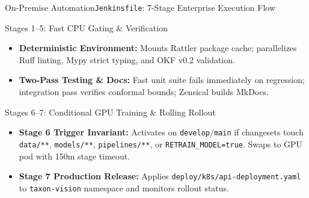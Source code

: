 \begin{frame}[fragile]{On-Premise Automation}{\texttt{Jenkinsfile}: 7-Stage Enterprise Execution Flow}
    \begin{block}{Stages 1--5: Fast CPU Gating \& Verification}
        \begin{itemize}\tiny
            \item \textbf{Deterministic Environment:} Mounts Rattler package cache; parallelizes Ruff linting, Mypy strict typing, and OKF v0.2 validation.
            \item \textbf{Two-Pass Testing \& Docs:} Fast unit suite fails immediately on regression; integration pass verifies conformal bounds; Zensical builds MkDocs.
        \end{itemize}
    \end{block}
    \begin{block}{Stages 6--7: Conditional GPU Training \& Rolling Rollout}
        \begin{itemize}\tiny
            \item \textbf{Stage 6 Trigger Invariant:} Activates on \texttt{develop}/\texttt{main} if changesets touch \texttt{data/**}, \texttt{models/**}, \texttt{pipelines/**}, or \texttt{RETRAIN\_MODEL=true}. Swaps to GPU pod with 150m stage timeout.
            \item \textbf{Stage 7 Production Release:} Applies \texttt{deploy/k8s/api-deployment.yaml} to \texttt{taxon-vision} namespace and monitors rollout status.
        \end{itemize}
    \end{block}

\end{frame}

